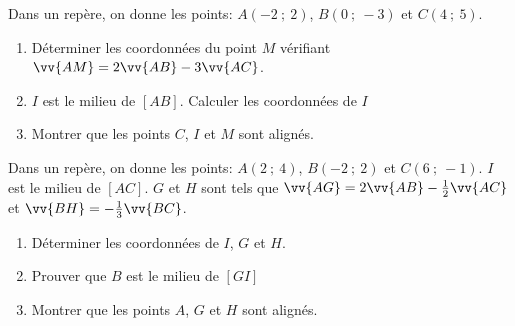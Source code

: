 \documentclass[main.tex]{subfiles}
\begin{document}
\begin{exercise} \hfill 

\noindent 	Dans un repère, on donne les points: $A(-2~;~2)$, $B(0~;~-3)$ et $C(4~;~5)$.
\begin{enumerate}[label=\arabic*),leftmargin=*]
\item Déterminer les coordonnées du point $M$ vérifiant $\vv{AM}=2\vv{AB}-3\vv{AC}$.
\item $I$ est le milieu de $[AB]$. Calculer les coordonnées de $I$
\item Montrer que les points $C$, $I$ et $M$ sont alignés.
\end{enumerate} 
\end{exercise}
\begin{exercise} \hfill 

\noindent 	Dans un repère, on donne les points: $A(2~;~4)$, $B(-2~;~2)$ et $C(6~;~-1)$. $I$ est le milieu de $[AC]$. $G$ et $H$ sont tels que $\vv{AG}=2\vv{AB}-\tfrac{1}{2}\vv{AC}$ et $\vv{BH}=-\tfrac{1}{3}\vv{BC}$.
\begin{enumerate}[label=\arabic*),leftmargin=*]
\item Déterminer les coordonnées de $I$, $G$ et $H$.
\item Prouver que $B$ est le milieu de $[GI]$
\item Montrer que les points $A$, $G$ et $H$ sont alignés.
\end{enumerate} 
\end{exercise}
\end{document}

